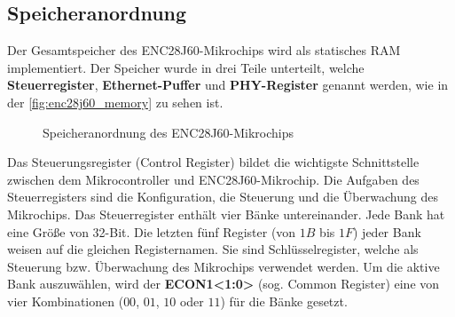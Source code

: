 \subsection{Speicheranordnung}
Der Gesamtspeicher des ENC28J60-Mikrochips wird als statisches RAM implementiert. Der Speicher wurde in drei Teile unterteilt, welche \textbf{Steuerregister}, \textbf{Ethernet-Puffer} und \textbf{PHY-Register} genannt werden, wie in der \autoref{fig:enc28j60_memory} zu sehen ist.  \smallskip \smallskip

\begin{figure}[htbp]
	\centering
	\caption[Speicheranordnung des ENC28J60-Mikrochips]{Speicheranordnung des ENC28J60-Mikrochips \cite{Microchip:ENC28J60:Datasheet}}\label{fig:enc28j60_memory}
\end{figure}

Das Steuerungsregister (Control Register) bildet die wichtigste Schnittstelle zwischen dem Mikrocontroller und ENC28J60-Mikrochip. Die Aufgaben des Steuerregisters sind die Konfiguration, die Steuerung und die Überwachung des Mikrochips. Das Steuerregister enthält vier Bänke untereinander. Jede Bank hat eine Größe von 32-Bit. Die letzten fünf Register (von $1B$ bis $1F$) jeder Bank weisen auf die gleichen Registernamen. Sie sind Schlüsselregister, welche als Steuerung bzw. Überwachung des Mikrochips verwendet werden. Um die aktive Bank auszuwählen, wird der \textbf{ECON1<1:0>} (sog. Common Register) eine von vier Kombinationen ($00$, $01$, $10$ oder $11$) für die Bänke gesetzt. \smallskip \smallskip

